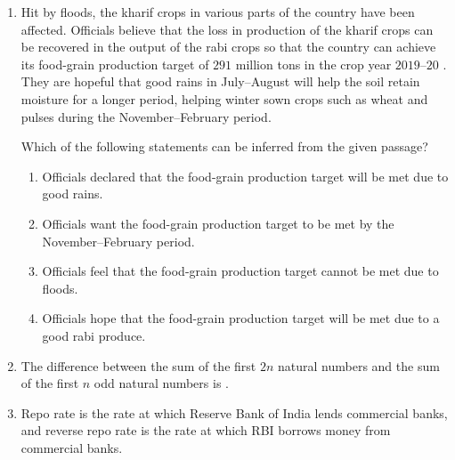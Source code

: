 \documentclass[journal,12pt,onecolumn]{IEEEtran}
\theoremstyle{remark}
\begin{document}
\begin{enumerate}[start=1, label=Q.\arabic*]
\item Hit by floods, the kharif  crops in various parts of the country have been affected. Officials believe that the loss in production of the kharif crops can be recovered in the output of the rabi  crops so that the country can achieve its food-grain production target of $291$ million tons in the crop year $2019$–$20$ . They are hopeful that good rains in July–August will help the soil retain moisture for a longer period, helping winter sown crops such as wheat and pulses during the November–February period.  

Which of the following statements can be inferred from the given passage?

\begin{enumerate}
\item Officials declared that the food-grain production target will be met due to good rains.
\item Officials want the food-grain production target to be met by the November–February period.
\item Officials feel that the food-grain production target cannot be met due to floods.
\item Officials hope that the food-grain production target will be met due to a good rabi produce.
\end{enumerate}

\hfill{}

\item The difference between the sum of the first $2n$ natural numbers and the sum of the first $n$ odd natural numbers is \underline{\hspace{2cm}}.

\begin{enumerate}
\end{enumerate}

\hfill{}

\item Repo rate is the rate at which Reserve Bank of India  lends commercial banks, and reverse repo rate is the rate at which RBI borrows money from commercial banks.  


\end{enumerate}
\end{document}
